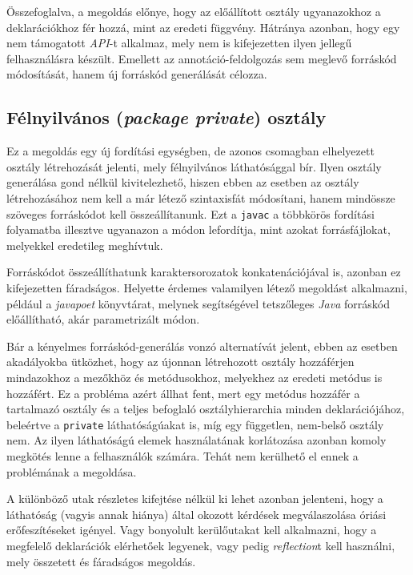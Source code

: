 Összefoglalva, a megoldás előnye, hogy az előállított osztály ugyanazokhoz a deklarációkhoz fér hozzá, mint az eredeti függvény. Hátránya azonban, hogy egy nem támogatott \textit{API}-t alkalmaz, mely nem is kifejezetten ilyen jellegű felhasználásra készült. Emellett az annotáció-feldolgozás sem meglevő forráskód módosítását, hanem új forráskód generálását célozza.

\subsection{Félnyilvános (\textit{package private}) osztály}

Ez a megoldás egy új fordítási egységben, de azonos csomagban elhelyezett osztály létrehozását jelenti, mely félnyilvános láthatósággal bír. Ilyen osztály generálása gond nélkül kivitelezhető, hiszen ebben az esetben az osztály létrehozásához nem kell a már létező szintaxisfát módosítani, hanem mindössze szöveges forráskódot kell összeállítanunk. Ezt a \texttt{javac} a többkörös fordítási folyamatba illesztve ugyanazon a módon lefordítja, mint azokat forrásfájlokat, melyekkel eredetileg meghívtuk.

Forráskódot összeállíthatunk karaktersorozatok konkatenációjával is, azonban ez kifejezetten fáradságos. Helyette érdemes valamilyen létező megoldást alkalmazni, például a \textit{javapoet} könyvtárat, melynek segítségével tetszőleges \textit{Java} forráskód előállítható, akár parametrizált módon.

Bár a kényelmes forráskód-generálás vonzó alternatívát jelent, ebben az esetben akadályokba ütközhet, hogy az újonnan létrehozott osztály hozzáférjen mindazokhoz a mezőkhöz és metódusokhoz, melyekhez az eredeti metódus is hozzáfért. Ez a probléma azért állhat fent, mert egy metódus hozzáfér a tartalmazó osztály és a teljes befoglaló osztályhierarchia minden deklarációjához, beleértve a \texttt{private} láthatóságúakat is, míg egy független, nem-belső osztály nem. Az ilyen láthatóságú elemek használatának korlátozása azonban komoly megkötés lenne a felhasználók számára. Tehát nem kerülhető el ennek a problémának a megoldása.

A különböző utak részletes kifejtése nélkül ki lehet azonban jelenteni, hogy a láthatóság (vagyis annak hiánya) által okozott kérdések megválaszolása óriási erőfeszítéseket igényel. Vagy bonyolult kerülőutakat kell alkalmazni, hogy a megfelelő deklarációk elérhetőek legyenek, vagy pedig \textit{reflection}t kell használni, mely összetett és fáradságos megoldás.

